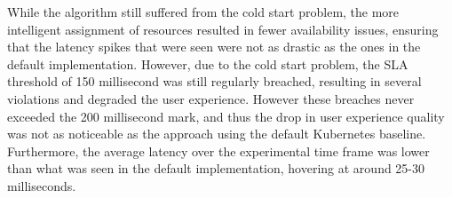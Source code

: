 While the algorithm still suffered from the cold start problem, the more intelligent assignment of resources resulted in fewer availability issues, ensuring that the latency spikes that were seen were not as drastic as the ones in the default implementation. However, due to the cold start problem, the SLA threshold of 150 millisecond was still regularly breached, resulting in several violations and degraded the user experience. However these breaches never exceeded the 200 millisecond mark, and thus the drop in user experience quality was not as noticeable as the approach using the default Kubernetes baseline. Furthermore, the average latency over the experimental time frame was lower than what was seen in the default implementation, hovering at around 25-30 milliseconds.\par

\begin{center}
\begin{minipage}{\linewidth}
    \label{fig:exp2-reactive-k8s}
\end{minipage}
\end{center}

